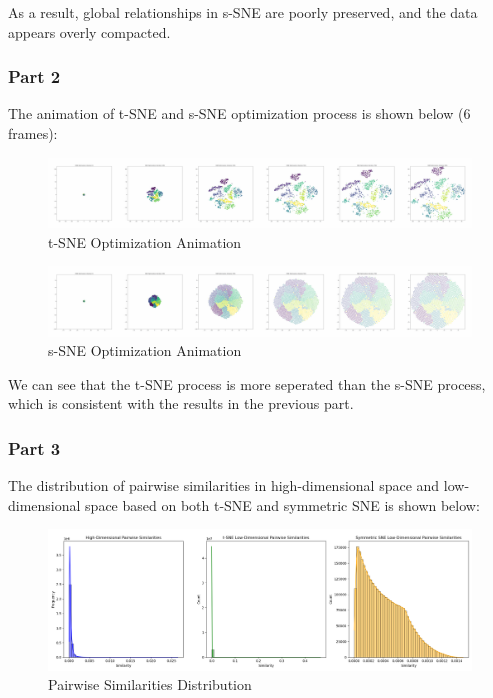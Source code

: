 \documentclass{homework}
\begin{document}
As a result, global relationships in s-SNE are poorly preserved, and the data appears overly compacted.

\subsubsection{Part 2}

The animation of t-SNE and s-SNE optimization process is shown below (6 frames):

\begin{figure}[H]
    \centering
    \includegraphics[width=1\textwidth]{figures/flatgif_tsne_animation.png}
    \caption{t-SNE Optimization Animation}
\end{figure}

\begin{figure}[H]
    \centering
    \includegraphics[width=1\textwidth]{figures/flatgif_symmetric_sne_animation.png}
    \caption{s-SNE Optimization Animation}
\end{figure}

We can see that the t-SNE process is more seperated than the s-SNE process, which is consistent with the results in the previous part.

\subsubsection{Part 3}

The distribution of pairwise similarities in high-dimensional space and low-dimensional space based on both t-SNE and symmetric SNE is shown below:

\begin{figure}[H]
    \centering
    \includegraphics[width=1\textwidth]{figures/pairwise_similarities_distribution.png}
    \caption{Pairwise Similarities Distribution}
\end{figure}
\end{document}
